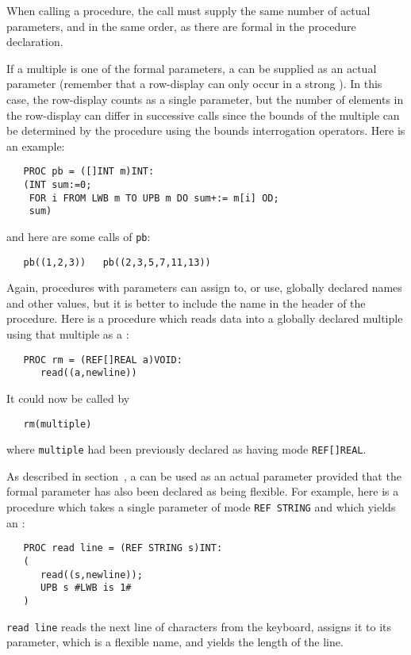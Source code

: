 When calling a procedure, the call must supply the same number
of actual parameters, and in the same order, as there are formal
 in the procedure declaration.

If a multiple is one of the formal parameters, a
 can be supplied as an actual parameter
(remember that a row-display can only occur in a strong
).  In this case, the row-display counts
as a single parameter, but the number of elements in the row-display
can differ in successive calls since the bounds of the multiple can
be determined by the procedure using the bounds interrogation
operators.  Here is an example:
\begin{verbatim}
   PROC pb = ([]INT m)INT:
   (INT sum:=0;
    FOR i FROM LWB m TO UPB m DO sum+:= m[i] OD;
    sum)
\end{verbatim}
\noindent
and here are some calls of \verb|pb|:
\begin{verbatim}
   pb((1,2,3))   pb((2,3,5,7,11,13))
\end{verbatim}

Again, procedures with parameters can assign to, or use, globally
declared names and other values, but it is better to include the name
in the header of the procedure. Here is a procedure which reads data
into a globally declared multiple using that multiple as a
:
\begin{verbatim}
   PROC rm = (REF[]REAL a)VOID:
      read((a,newline))
\end{verbatim}
\noindent
It could now be called by
\begin{verbatim}
   rm(multiple)
\end{verbatim}
\noindent
where \verb|multiple| had been previously declared as having mode
\verb|REF[]REAL|.

As described in section~, a  can
be used as an actual parameter provided that the formal parameter has
also been declared as being flexible.  For example, here is a
procedure which takes a single parameter of mode \verb|REF STRING|
and which yields an :
\begin{verbatim}
   PROC read line = (REF STRING s)INT:
   (
      read((s,newline));
      UPB s #LWB is 1#
   )
\end{verbatim}
\noindent
\verb|read line| reads the next line of characters from the keyboard,
assigns it to its parameter, which is a flexible name, and yields the
length of the line.

